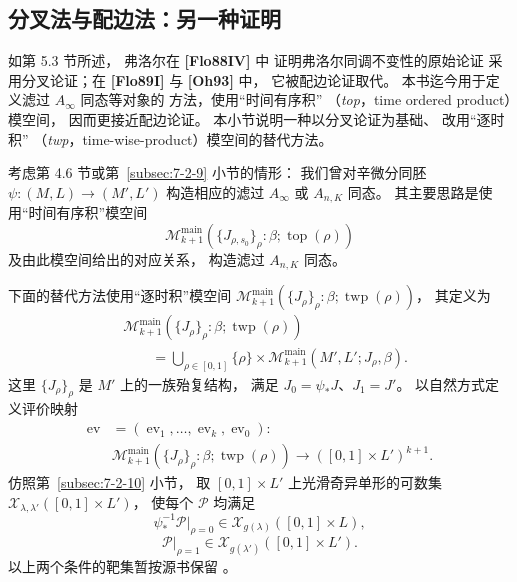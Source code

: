 
\subsection{分叉法与配边法：另一种证明}
\label{subsec:7-2-14}

如第 5.3 节所述，
弗洛尔在 \textbf{[Flo88IV]} 中
证明弗洛尔同调不变性的原始论证
采用分叉论证；在 \textbf{[Flo89I]}
与 \textbf{[Oh93]} 中，
它被配边论证取代。
本书迄今用于定义滤过 $A_\infty$ 同态等对象的
方法，使用“时间有序积”
（\emph{top}，time ordered product）模空间，
因而更接近配边论证。
本小节说明一种以分叉论证为基础、
改用“逐时积”
（\emph{twp}，time-wise-product）模空间的替代方法。

考虑第 4.6 节或第~\ref{subsec:7-2-9} 小节的情形：
我们曾对辛微分同胚
$\psi\colon(M,L)\to(M',L')$
构造相应的滤过 $A_\infty$ 或
$A_{n,K}$ 同态。
其主要思路是使用“时间有序积”模空间
\[
\mathcal M^{\mathrm{main}}_{k+1}
(\{J_{\rho,s_0}\}_\rho:\beta;
\operatorname{top}(\rho))
\]
及由此模空间给出的对应关系，
构造滤过 $A_{n,K}$ 同态。

下面的替代方法使用“逐时积”模空间
$\mathcal M^{\mathrm{main}}_{k+1}
(\{J_\rho\}_\rho:\beta;
\operatorname{twp}(\rho))$，
其定义为
\begin{equation}
\begin{aligned}
&\mathcal M^{\mathrm{main}}_{k+1}
(\{J_\rho\}_\rho:\beta;
\operatorname{twp}(\rho))\\
&\qquad=\bigcup_{\rho\in[0,1]}
\{\rho\}\times
\mathcal M^{\mathrm{main}}_{k+1}
(M',L';J_\rho,\beta).
\end{aligned}
\tag{7.2.359}\label{eq:7-2-359}
\end{equation}
这里 $\{J_\rho\}_\rho$ 是 $M'$ 上的一族殆复结构，
满足 $J_0=\psi_*J$、$J_1=J'$。
以自然方式定义评价映射
\begin{equation}
\begin{aligned}
\operatorname{ev}
&=(\operatorname{ev}_1,\ldots,
\operatorname{ev}_k,\operatorname{ev}_0)\colon\\
&\mathcal M^{\mathrm{main}}_{k+1}
(\{J_\rho\}_\rho:\beta;
\operatorname{twp}(\rho))
\longrightarrow([0,1]\times L')^{k+1}.
\end{aligned}
\tag{7.2.360}\label{eq:7-2-360}
\end{equation}
仿照第~\ref{subsec:7-2-10} 小节，
取 $[0,1]\times L'$ 上光滑奇异单形的可数集
$\mathcal X_{\lambda,\lambda'}([0,1]\times L')$，
使每个 $\mathcal P$ 均满足
\begin{equation}
\psi_*^{-1}\mathcal P|_{\rho=0}
\in\mathcal X_{g(\lambda)}([0,1]\times L),
\tag{7.2.361.1}\label{eq:7-2-361-1}
\end{equation}
\begin{equation}
\mathcal P|_{\rho=1}
\in\mathcal X_{g(\lambda')}([0,1]\times L').
\tag{7.2.361.2}\label{eq:7-2-361-2}
\end{equation}
以上两个条件的靶集暂按源书保留
。


